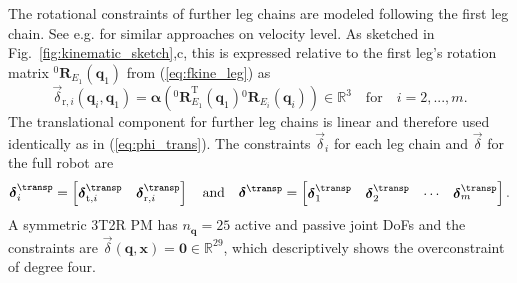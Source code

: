 \documentclass[
	graybox,
	vecphys] %
	{svmult}
\newcommand{\bm}[1]{\boldsymbol{#1}}
\newcommand{\rotmat}[2]{{{ }^{#1}\boldsymbol{R}}_{#2}}
\newcommand{\Res}[0]{\vec{\delta}}
\begin{document}
The rotational constraints of further leg chains are modeled following the first leg chain. 
See e.g. \cite{Gogu2008,BriotKha2015} for similar approaches on velocity level.
As sketched in Fig.~\ref{fig:kinematic_sketch},c, this is expressed relative to the first leg's rotation matrix $\rotmat{0}{E_1}(\bm{q}_1)$ from (\ref{eq:fkine_leg}) as
\begin{equation}
\Res_{\mathrm{r},i}(\bm{q}_i,\bm{q}_1)
=
\bm{\alpha}\left(\rotmat{0}{E_1}^\mathrm{T}(\bm{q}_1)\rotmat{0}{E_i}(\bm{q}_i)\right) \in {\mathbb{R}}^{3}
\quad \mathrm{for} \quad i=2,...,m.
\end{equation}
The translational component for further leg chains is linear and therefore used identically as in (\ref{eq:phi_trans}).
The constraints $\Res_i$ for each leg chain and $\Res$ for the full robot are
\vspace{-0.2cm}
\begin{equation}
\Res_i^\transp=\begin{bmatrix}
\Res_{\mathrm{t},i}^\transp & \Res_{\mathrm{r},i}^\transp
\end{bmatrix}
\quad \mathrm{and} \quad
\Res^\transp
=
\begin{bmatrix}
\Res_1^\transp &
\Res_2^\transp &
\cdots &
\Res_m^\transp
\end{bmatrix}.
\label{eq:constr}
\end{equation}
%
A symmetric 3T2R PM 
has $n_{\bm{q}}{=}25$ active and passive joint DoFs and
the constraints are $\Res(\bm{q},\bm{x}){=}\bm{0} \in {\mathbb{R}}^{29}$, which descriptively shows the overconstraint of degree four.
\end{document}
